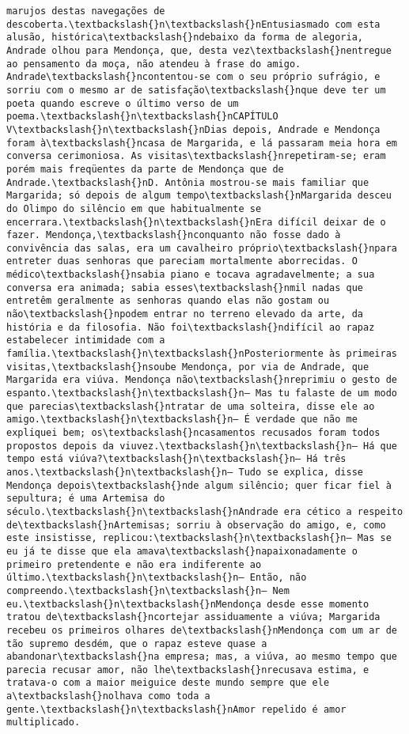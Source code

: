 \documentclass[11pt]{article}
\begin{document}
\begin{Verbatim}[commandchars=\\\{\}]
marujos destas navegações de descoberta.\textbackslash{}n\textbackslash{}nEntusiasmado com esta alusão, histórica\textbackslash{}ndebaixo da forma de alegoria, Andrade olhou para Mendonça, que, desta vez\textbackslash{}nentregue ao pensamento da moça, não atendeu à frase do amigo. Andrade\textbackslash{}ncontentou-se com o seu próprio sufrágio, e sorriu com o mesmo ar de satisfação\textbackslash{}nque deve ter um poeta quando escreve o último verso de um poema.\textbackslash{}n\textbackslash{}nCAPÍTULO V\textbackslash{}n\textbackslash{}nDias depois, Andrade e Mendonça foram à\textbackslash{}ncasa de Margarida, e lá passaram meia hora em conversa cerimoniosa. As visitas\textbackslash{}nrepetiram-se; eram porém mais freqüentes da parte de Mendonça que de Andrade.\textbackslash{}nD. Antônia mostrou-se mais familiar que Margarida; só depois de algum tempo\textbackslash{}nMargarida desceu do Olimpo do silêncio em que habitualmente se encerrara.\textbackslash{}n\textbackslash{}nEra difícil deixar de o fazer. Mendonça,\textbackslash{}nconquanto não fosse dado à convivência das salas, era um cavalheiro próprio\textbackslash{}npara entreter duas senhoras que pareciam mortalmente aborrecidas. O médico\textbackslash{}nsabia piano e tocava agradavelmente; a sua conversa era animada; sabia esses\textbackslash{}nmil nadas que entretêm geralmente as senhoras quando elas não gostam ou não\textbackslash{}npodem entrar no terreno elevado da arte, da história e da filosofia. Não foi\textbackslash{}ndifícil ao rapaz estabelecer intimidade com a família.\textbackslash{}n\textbackslash{}nPosteriormente às primeiras visitas,\textbackslash{}nsoube Mendonça, por via de Andrade, que Margarida era viúva. Mendonça não\textbackslash{}nreprimiu o gesto de espanto.\textbackslash{}n\textbackslash{}n— Mas tu falaste de um modo que parecias\textbackslash{}ntratar de uma solteira, disse ele ao amigo.\textbackslash{}n\textbackslash{}n— É verdade que não me expliquei bem; os\textbackslash{}ncasamentos recusados foram todos propostos depois da viuvez.\textbackslash{}n\textbackslash{}n— Há que tempo está viúva?\textbackslash{}n\textbackslash{}n— Há três anos.\textbackslash{}n\textbackslash{}n— Tudo se explica, disse Mendonça depois\textbackslash{}nde algum silêncio; quer ficar fiel à sepultura; é uma Artemisa do século.\textbackslash{}n\textbackslash{}nAndrade era cético a respeito de\textbackslash{}nArtemisas; sorriu à observação do amigo, e, como este insistisse, replicou:\textbackslash{}n\textbackslash{}n— Mas se eu já te disse que ela amava\textbackslash{}napaixonadamente o primeiro pretendente e não era indiferente ao último.\textbackslash{}n\textbackslash{}n— Então, não compreendo.\textbackslash{}n\textbackslash{}n— Nem eu.\textbackslash{}n\textbackslash{}nMendonça desde esse momento tratou de\textbackslash{}ncortejar assiduamente a viúva; Margarida recebeu os primeiros olhares de\textbackslash{}nMendonça com um ar de tão supremo desdém, que o rapaz esteve quase a abandonar\textbackslash{}na empresa; mas, a viúva, ao mesmo tempo que parecia recusar amor, não lhe\textbackslash{}nrecusava estima, e tratava-o com a maior meiguice deste mundo sempre que ele a\textbackslash{}nolhava como toda a gente.\textbackslash{}n\textbackslash{}nAmor repelido é amor multiplicado. 
\end{Verbatim}
\end{document}
